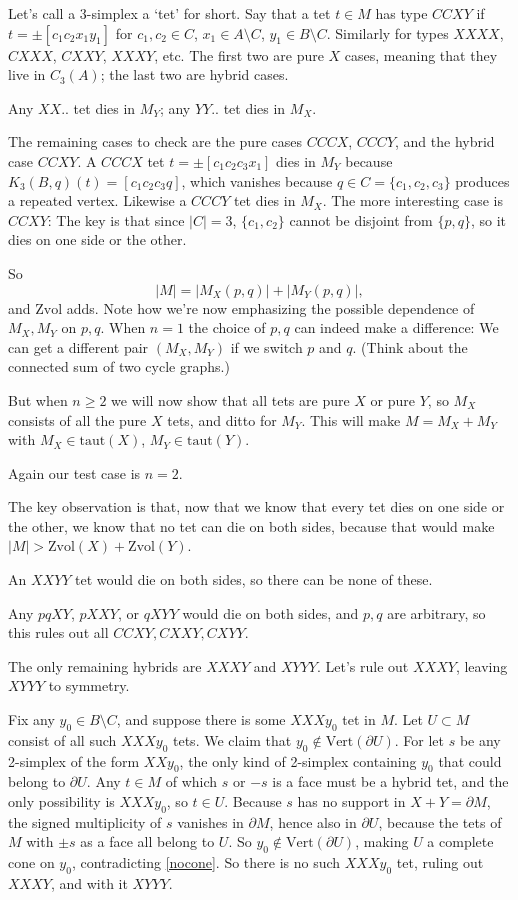 \documentclass[12pt]{article}
\def\del{\partial}
\newcommand{\kw}{\mathrm}
\newcommand{\vertices}{\kw{Vert}}
\newcommand{\taut}{\kw{taut}}
\newcommand{\Zvol}{\kw{Zvol}}
\begin{document}
Let's call a $3$-simplex a `tet' for short.
Say that a tet $t \in M$ has type $CCXY$ if $t= \pm[c_1c_2x_1y_1]$
for $c_1,c_2 \in C$, $x_1 \in A \setminus C$, $y_1 \in B \setminus C$.
Similarly for types $XXXX$, $CXXX$, $CXXY$, $XXXY$, etc.
The first two are pure $X$ cases, meaning that they live in $C_3(A)$;
the last two are hybrid cases.

Any $XX..$ tet dies in $M_Y$;
any $YY..$ tet dies in $M_X$.

The remaining cases to check are
the pure cases $CCCX$, $CCCY$,
and the hybrid case $CCXY$.
A $CCCX$ tet $t=\pm[c_1c_2c_3x_1]$ dies in $M_Y$ because
$K_3(B,q)(t)=[c_1c_2c_3q]$,
which vanishes because $q \in C = \{c_1,c_2,c_3\}$ produces a repeated vertex.
Likewise a $CCCY$ tet dies in $M_X$.
The more interesting case is $CCXY$:
The key is that since $|C|=3$, $\{c_1,c_2\}$ cannot be disjoint from $\{p,q\}$,
so it dies on one side or the other.

So 
\[
|M| = |M_X(p,q)| + |M_Y(p,q)|,
\]
and $\Zvol$ adds.
Note how we're now emphasizing the possible dependence of $M_X,M_Y$ on $p,q$.
When $n=1$ the choice of $p,q$ can indeed make a difference:
We can get a different pair $(M_X,M_Y)$ if we switch
$p$ and $q$.
(Think about the connected sum of two cycle graphs.)

But when $n \geq 2$ we will now show that all tets are pure $X$ or pure $Y$,
so $M_X$ consists of all the pure $X$ tets, and ditto for $M_Y$.
This will make
$M = M_X + M_Y$ with $M_X \in \taut(X)$, $M_Y \in \taut(Y)$.

Again our test case is $n=2$.

The key observation is that, now that we know that every tet dies on
one side or the other, we know that no tet can die on both sides,
because that would make $|M| > \Zvol(X) + \Zvol(Y)$.

An $XXYY$ tet would die on both sides, so there can be none of these.

Any $pqXY$, $pXXY$, or $qXYY$ would die on both sides, and $p,q$ are arbitrary,
so this rules out all $CCXY,CXXY,CXYY$.

The only remaining hybrids are $XXXY$ and $XYYY$.
Let's rule out $XXXY$, leaving $XYYY$ to symmetry.

Fix any $y_0 \in B \setminus C$, and suppose there is
some $XXXy_0$ tet in $M$.
Let $U \subset M$ consist of all such $XXXy_0$ tets.
We claim that $y_0 \notin \vertices(\del U)$.
For let $s$ be any 2-simplex of the form $XXy_0$,
the only kind of 2-simplex containing $y_0$ that could belong
to $\del U$.
Any $t \in M$ of which $s$ or $-s$ is a face must be a hybrid tet,
and the only possibility is $XXXy_0$, so $t \in U$.
Because $s$ has no support in $X+Y=\del M$, the signed multiplicity of $s$
vanishes in $\del M$,
hence also in $\del U$,
because the tets of $M$ with $\pm s$ as a face all belong to $U$.
So $y_0 \notin \vertices(\del U)$,
making $U$ a complete cone on $y_0$,
contradicting \ref{nocone}.
So there is no such $XXXy_0$ tet, ruling out $XXXY$,
and with it $XYYY$.
\end{document}

